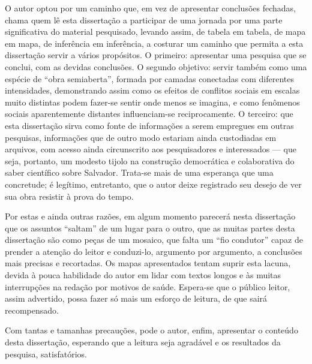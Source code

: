 O autor optou por um caminho que, em vez de apresentar conclusões fechadas, chama quem lê esta dissertação a participar de uma jornada por uma parte significativa do material pesquisado, levando assim, de tabela em tabela, de mapa em mapa, de inferência em inferência, a costurar um caminho que permita a esta dissertação servir a vários propósitos. O primeiro: apresentar uma pesquisa que se conclui, com as devidas conclusões. O segundo objetivo: servir também como uma espécie de ``obra semiaberta'', formada por camadas conectadas com diferentes intensidades, demonstrando assim como os efeitos de conflitos sociais em escalas muito distintas podem fazer-se sentir onde menos se imagina, e como fenômenos sociais aparentemente distantes influenciam-se reciprocamente. O terceiro: que esta dissertação sirva como fonte de informações a serem empregues em outras pesquisas, informações que de outro modo estariam ainda custodiadas em arquivos, com acesso ainda circunscrito aos pesquisadores e interessados --- que seja, portanto, um modesto tijolo na construção democrática e colaborativa do saber científico sobre Salvador. Trata-se mais de uma esperança que uma concretude; é legítimo, entretanto, que o autor deixe registrado seu desejo de ver sua obra resistir à prova do tempo.

Por estas e ainda outras razões, em algum momento parecerá nesta dissertação que os assuntos ``saltam'' de um lugar para o outro, que as muitas partes desta dissertação são como peças de um mosaico, que falta um ``fio condutor'' capaz de prender a atenção do leitor e conduzi-lo, argumento por argumento, a conclusões mais precisas e recortadas. Os mapas apresentados tentam suprir esta lacuna, devida à pouca habilidade do autor em lidar com textos longos e às muitas interrupções na redação por motivos de saúde. Espera-se que o público leitor, assim advertido, possa fazer só mais um esforço de leitura, de que sairá recompensado.

Com tantas e tamanhas precauções, pode o autor, enfim, apresentar o conteúdo desta dissertação, esperando que a leitura seja agradável e os resultados da pesquisa, satisfatórios.